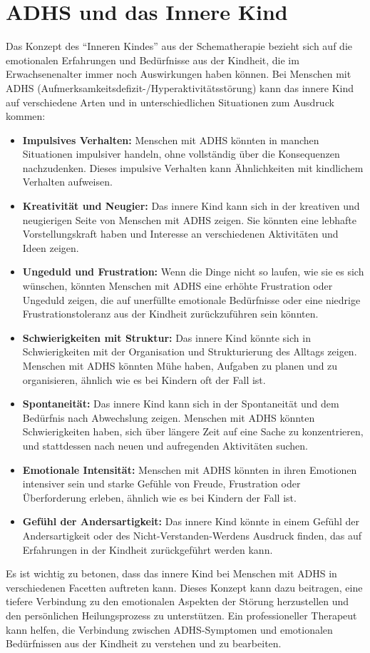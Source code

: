 \section{ADHS und das Innere Kind}
%
Das Konzept des \enquote{Inneren Kindes} aus der Schematherapie bezieht sich auf die emotionalen Erfahrungen und Bedürfnisse aus der Kindheit, die im Erwachsenenalter immer noch Auswirkungen haben können. Bei Menschen mit ADHS (Aufmerksamkeitsdefizit-/Hyperaktivitätsstörung) kann das innere Kind auf verschiedene Arten und in unterschiedlichen Situationen zum Ausdruck kommen:
\begin{itemize}
    \item \textbf{Impulsives Verhalten:} Menschen mit ADHS könnten in manchen Situationen impulsiver handeln, ohne vollständig über die Konsequenzen nachzudenken. Dieses impulsive Verhalten kann Ähnlichkeiten mit kindlichem Verhalten aufweisen.
    \item \textbf{Kreativität und Neugier:} Das innere Kind kann sich in der kreativen und neugierigen Seite von Menschen mit ADHS zeigen. Sie könnten eine lebhafte Vorstellungskraft haben und Interesse an verschiedenen Aktivitäten und Ideen zeigen.
    \item \textbf{Ungeduld und Frustration:} Wenn die Dinge nicht so laufen, wie sie es sich wünschen, könnten Menschen mit ADHS eine erhöhte Frustration oder Ungeduld zeigen, die auf unerfüllte emotionale Bedürfnisse oder eine niedrige Frustrationstoleranz aus der Kindheit zurückzuführen sein könnten.
    \item \textbf{Schwierigkeiten mit Struktur:} Das innere Kind könnte sich in Schwierigkeiten mit der Organisation und Strukturierung des Alltags zeigen. Menschen mit ADHS könnten Mühe haben, Aufgaben zu planen und zu organisieren, ähnlich wie es bei Kindern oft der Fall ist.
    \item \textbf{Spontaneität:} Das innere Kind kann sich in der Spontaneität und dem Bedürfnis nach Abwechslung zeigen. Menschen mit ADHS könnten Schwierigkeiten haben, sich über längere Zeit auf eine Sache zu konzentrieren, und stattdessen nach neuen und aufregenden Aktivitäten suchen.
    \item \textbf{Emotionale Intensität:} Menschen mit ADHS könnten in ihren Emotionen intensiver sein und starke Gefühle von Freude, Frustration oder Überforderung erleben, ähnlich wie es bei Kindern der Fall ist.
    \item \textbf{Gefühl der Andersartigkeit:} Das innere Kind könnte in einem Gefühl der Andersartigkeit oder des Nicht-Verstanden-Werdens Ausdruck finden, das auf Erfahrungen in der Kindheit zurückgeführt werden kann.
\end{itemize}
%
Es ist wichtig zu betonen, dass das innere Kind bei Menschen mit ADHS in verschiedenen Facetten auftreten kann. Dieses Konzept kann dazu beitragen, eine tiefere Verbindung zu den emotionalen Aspekten der Störung herzustellen und den persönlichen Heilungsprozess zu unterstützen. Ein professioneller Therapeut kann helfen, die Verbindung zwischen ADHS-Symptomen und emotionalen Bedürfnissen aus der Kindheit zu verstehen und zu bearbeiten.



